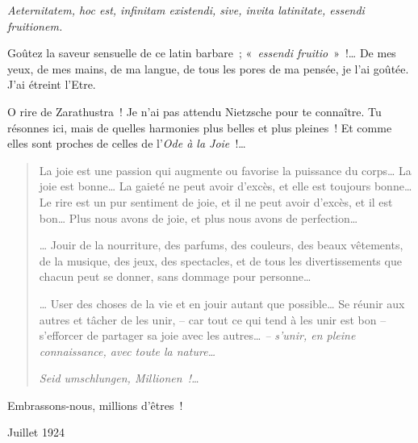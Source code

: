 \emph{Aeternitatem, hoc est, infinitam existendi, sive, invita
latinitate, essendi fruitionem.}

Goûtez la saveur sensuelle de ce latin barbare~; «~\emph{essendi
fruitio}~»~!\ldots{} De mes yeux, de mes mains, de ma langue, de tous les
pores de ma pensée, je l'ai goûtée. J'ai étreint l'Etre.

O rire de Zarathustra~! Je n'ai pas attendu Nietzsche pour te connaître.
Tu résonnes ici, mais de quelles harmonies plus belles et plus pleines~!
Et comme elles sont proches de celles de l'\emph{Ode à la Joie~}!\ldots{}

\begin{quote}
La joie est une passion qui augmente ou favorise la puissance du
corps\ldots{} La joie est bonne\ldots{} La gaieté ne peut avoir d'excès, et elle
est toujours bonne\ldots{}
Le rire est un pur sentiment de joie, et il ne
peut avoir d'excès, et il est bon\ldots{} Plus nous avons de joie, et plus
nous avons de perfection\ldots{}

\ldots{} Jouir de la nourriture, des parfums, des couleurs, des beaux
vêtements, de la musique, des jeux, des spectacles, et de tous les
divertissements que chacun peut se donner, sans dommage pour
personne\ldots{}

\ldots{} User des choses de la vie et en jouir autant que possible\ldots{}
Se réunir aux autres et tâcher de les unir, -- car tout ce qui
tend à les unir est bon -- s'efforcer de partager sa joie avec les
autres\ldots{} \emph{-- s'unir, en pleine
connaissance, avec toute la nature\ldots{}}

\emph{Seid umschlungen, Millionen~!\ldots{}}
\end{quote}

Embrassons-nous, millions d'êtres~!

\begin{flushright}
Juillet 1924
\end{flushright}